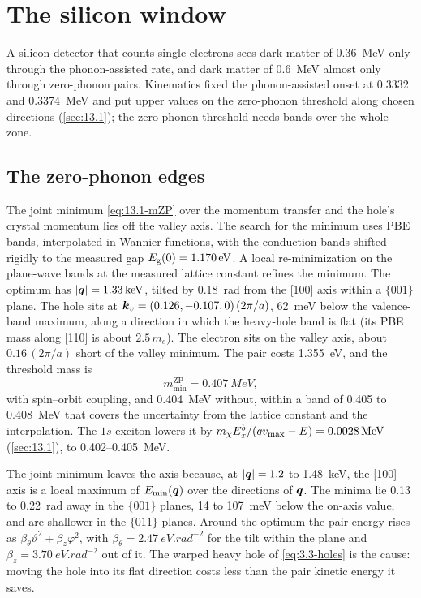 \section{The silicon window}\label{sec:13.9}

A silicon detector that counts single electrons sees dark matter of \SI{0.36}{MeV} only through the phonon-assisted rate, and dark matter of \SI{0.6}{MeV} almost only through zero-phonon pairs. Kinematics fixed the phonon-assisted onset at 0.3332 and \SI{0.3374}{MeV} and put upper values on the zero-phonon threshold along chosen directions (\cref{sec:13.1}); the zero-phonon threshold needs bands over the whole zone.

\subsection{The zero-phonon edges}\label{sec:13.9-edges}

The joint minimum \cref{eq:13.1-mZP} over the momentum transfer and the hole's crystal momentum lies off the valley axis. The search for the minimum uses PBE bands, interpolated in Wannier functions, with the conduction bands shifted rigidly to the measured gap $E_{\mathrm{g}}(0) = \SI{1.170}{eV}$. A local re-minimization on the plane-wave bands at the measured lattice constant refines the minimum. The optimum has $|\bm{q}| = \SI{1.33}{keV}$, tilted by \SI{0.18}{rad} from the [100] axis within a $\{001\}$ plane. The hole sits at $\bm{k}_v = (0.126, -0.107, 0)\,(2\pi/a)$, \SI{62}{meV} below the valence-band maximum, along a direction in which the heavy-hole band is flat (its PBE mass along [110] is about $2.5\,m_e$). The electron sits on the valley axis, about $0.16\,(2\pi/a)$ short of the valley minimum. The pair costs \SI{1.355}{eV}, and the threshold mass is
\begin{equation*}
  m_{\mathrm{min}}^{\mathrm{ZP}} = \SI{0.407}{MeV} ,
\end{equation*}
with spin--orbit coupling, and \SI{0.404}{MeV} without, within a band of 0.405 to \SI{0.408}{MeV} that covers the uncertainty from the lattice constant and the interpolation. The $1s$ exciton lowers it by $m_{\chi} E_x^b/(qv_{\mathrm{max}} - E) = \SI{0.0028}{MeV}$ (\cref{sec:13.1}), to 0.402--\SI{0.405}{MeV}.

The joint minimum leaves the axis because, at $|\bm{q}| = 1.2$ to \SI{1.48}{keV}, the [100] axis is a local maximum of $E_{\mathrm{min}}(\bm{q})$ over the directions of $\bm{q}$. The minima lie 0.13 to \SI{0.22}{rad} away in the $\{001\}$ planes, 14 to \SI{107}{meV} below the on-axis value, and are shallower in the $\{011\}$ planes. Around the optimum the pair energy rises as $\beta_\theta\vartheta^2 + \beta_z\varphi^2$, with $\beta_\theta = \SI{2.47}{eV.rad^{-2}}$ for the tilt within the plane and $\beta_z = \SI{3.70}{eV.rad^{-2}}$ out of it. The warped heavy hole of \cref{eq:3.3-holes} is the cause: moving the hole into its flat direction costs less than the pair kinetic energy it saves.

